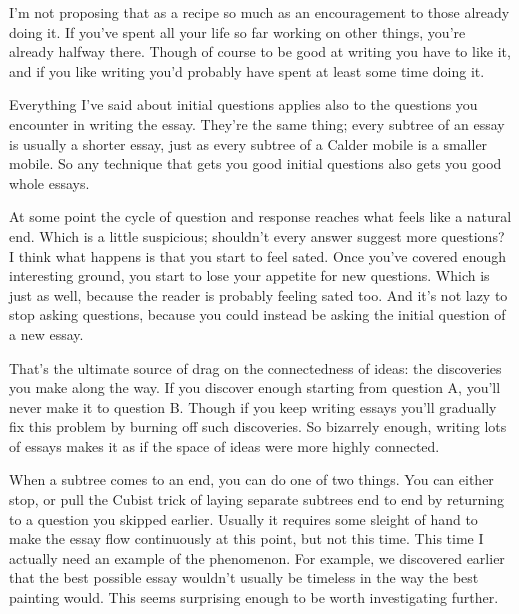 \documentclass[12pt]{book}
\begin{document}
I'm not proposing that as a recipe so much as an encouragement to those
already doing it. If you've spent all your life so far working on other
things, you're already halfway there. Though of course to be good at
writing you have to like it, and if you like writing you'd probably have
spent at least some time doing it.

Everything I've said about initial questions applies also to the
questions you encounter in writing the essay. They're the same thing;
every subtree of an essay is usually a shorter essay, just as every
subtree of a Calder mobile is a smaller mobile. So any technique that
gets you good initial questions also gets you good whole essays.

At some point the cycle of question and response reaches what feels like
a natural end. Which is a little suspicious; shouldn't every answer
suggest more questions? I think what happens is that you start to feel
sated. Once you've covered enough interesting ground, you start to lose
your appetite for new questions. Which is just as well, because the
reader is probably feeling sated too. And it's not lazy to stop asking
questions, because you could instead be asking the initial question of a
new essay.

That's the ultimate source of drag on the connectedness of ideas: the
discoveries you make along the way. If you discover enough starting from
question A, you'll never make it to question B. Though if you keep
writing essays you'll gradually fix this problem by burning off such
discoveries. So bizarrely enough, writing lots of essays makes it as if
the space of ideas were more highly connected.

When a subtree comes to an end, you can do one of two things. You can
either stop, or pull the Cubist trick of laying separate subtrees end to
end by returning to a question you skipped earlier. Usually it requires
some sleight of hand to make the essay flow continuously at this point,
but not this time. This time I actually need an example of the
phenomenon. For example, we discovered earlier that the best possible
essay wouldn't usually be timeless in the way the best painting would.
This seems surprising enough to be worth investigating further.
\end{document}
